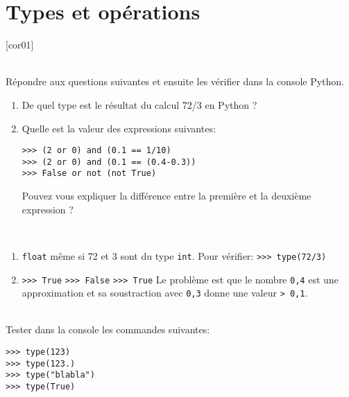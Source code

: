\documentclass[a4paper,12pt]{article}
\newcommand{\numero}{1}                                    %
\begin{document}


\setcounter{section}{\numero}
\section{Types et opérations}				
[cor01]

\exo{}  ~\\ 
Répondre aux questions suivantes et ensuite les vérifier dans la console Python.

\begin{enumerate}
	\item De quel type est le résultat du calcul 72/3 en Python ?
	\item Quelle est la valeur des expressions suivantes:  
	   \begin{lstlisting}[numbers=none]
>>> (2 or 0) and (0.1 == 1/10)
>>> (2 or 0) and (0.1 == (0.4-0.3))
>>> False or not (not True)
       \end{lstlisting}
       Pouvez vous expliquer la différence entre la première et la deuxième expression ?
	\end{enumerate}

	\begin{correction}
		~\\ 
		\begin{enumerate}
	\item \lstinline{float} même si 72 et 3 sont du type \lstinline{int}. Pour vérifier: \lstinline{>>> type(72/3)}
	\item \lstinline{>>> True}\newline
	      \lstinline{>>> False}\newline
	      \lstinline{>>> True}\newline
	      Le problème est que le nombre \lstinline{0,4} est une approximation et sa soustraction avec \lstinline{0,3} donne une valeur \lstinline{> 0,1}.
 		\end{enumerate}
	\end{correction}
\finexo
\exo{}  ~\\ 
Tester dans la console \py les commandes suivantes:
\begin{lstlisting}[numbers=none]
>>> type(123)
>>> type(123.)
>>> type("blabla")
>>> type(True)
\end{lstlisting}
\end{document}
